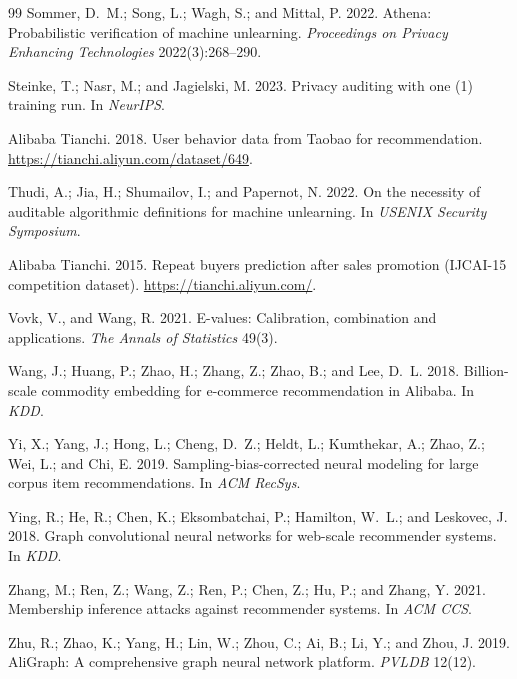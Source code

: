 \documentclass[10pt,twocolumn,letterpaper]{article}
\theoremstyle{definition}
\begin{document}
\begin{thebibliography}{99}
Sommer, D.~M.; Song, L.; Wagh, S.; and Mittal, P. 2022.
\newblock Athena: Probabilistic verification of machine unlearning.
\newblock \emph{Proceedings on Privacy Enhancing Technologies} 2022(3):268--290.

Steinke, T.; Nasr, M.; and Jagielski, M. 2023.
\newblock Privacy auditing with one (1) training run.
\newblock In \emph{NeurIPS}.

Alibaba Tianchi. 2018.
\newblock User behavior data from Taobao for recommendation.
\newblock \url{https://tianchi.aliyun.com/dataset/649}.

Thudi, A.; Jia, H.; Shumailov, I.; and Papernot, N. 2022.
\newblock On the necessity of auditable algorithmic definitions for machine unlearning.
\newblock In \emph{USENIX Security Symposium}.

Alibaba Tianchi. 2015.
\newblock Repeat buyers prediction after sales promotion (IJCAI-15 competition dataset).
\newblock \url{https://tianchi.aliyun.com/}.

Vovk, V., and Wang, R. 2021.
\newblock E-values: Calibration, combination and applications.
\newblock \emph{The Annals of Statistics} 49(3).

Wang, J.; Huang, P.; Zhao, H.; Zhang, Z.; Zhao, B.; and Lee, D.~L. 2018.
\newblock Billion-scale commodity embedding for e-commerce recommendation in Alibaba.
\newblock In \emph{KDD}.

Yi, X.; Yang, J.; Hong, L.; Cheng, D.~Z.; Heldt, L.; Kumthekar, A.; Zhao, Z.; Wei, L.; and Chi, E. 2019.
\newblock Sampling-bias-corrected neural modeling for large corpus item recommendations.
\newblock In \emph{ACM RecSys}.

Ying, R.; He, R.; Chen, K.; Eksombatchai, P.; Hamilton, W.~L.; and Leskovec, J. 2018.
\newblock Graph convolutional neural networks for web-scale recommender systems.
\newblock In \emph{KDD}.

Zhang, M.; Ren, Z.; Wang, Z.; Ren, P.; Chen, Z.; Hu, P.; and Zhang, Y. 2021.
\newblock Membership inference attacks against recommender systems.
\newblock In \emph{ACM CCS}.

Zhu, R.; Zhao, K.; Yang, H.; Lin, W.; Zhou, C.; Ai, B.; Li, Y.; and Zhou, J. 2019.
\newblock AliGraph: A comprehensive graph neural network platform.
\newblock \emph{PVLDB} 12(12).

\end{thebibliography}
\end{document}
